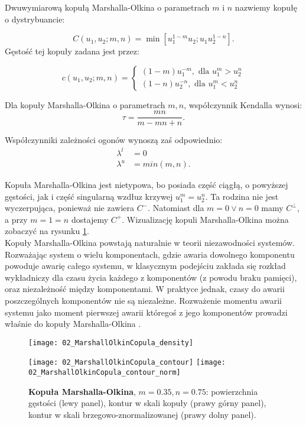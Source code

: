 \begin{df}
	Dwuwymiarową kopułą Marshalla-Olkina o parametrach $m$ i $n$ nazwiemy kopułę o dystrybuancie:
	
	$$ C(u_1, u_2; m,n) = \min[u_1^{1-m}u_2; u_1u_2^{1-n}].$$
	Gęstość tej kopuły zadana jest przez:
	
	$$
	c(u_1, u_2;m,n)=
	\begin{cases}
		(1-m)u_1^{-m},\text{ dla }u_1^m>u_2^n\\
		(1-n)u_2^{-n},\text{ dla }u_1^m<u_2^n
	\end{cases}
	$$	
\end{df}
\begin{prop}
	Dla kopuły Marshalla-Olkina o parametrach $m,n$, współczynnik Kendalla wynosi:
	$$ \tau = \frac{mn}{m-mn+n}.$$
	
	Współczynniki zależności ogonów wynoszą zaś odpowiednio:
	\begin{equation}
		\begin{split}
			\lambda^{l}&=0\\
			\lambda^{u}&=min(m,n).
		\end{split}
	\end{equation}
\end{prop}
Kopuła Marshalla-Olkina jest nietypowa, bo posiada część ciągłą, o powyższej gęstości, jak i część singularną wzdłuz krzywej $u_1^m=u_2^n$. Ta rodzina nie jest wyczerpująca, ponieważ nie zawiera $C^{-}$. Natomiast dla $m=0 \vee n=0$ mamy $C^{\perp}$, a przy $m=1=n$ dostajemy $C^{+}$. Wizualizację kopuli Marshalla-Olkina można zobaczyć na rysunku \ref{fig:marshall_olkin_copula_density}.\\
Kopuły Marshalla-Olkina powstają naturalnie w teorii niezawodności systemów. Rozważając system o wielu komponentach, gdzie awaria dowolnego komponentu powoduje awarię całego systemu, w klasycznym podejściu zakłada się rozkład wykładniczy dla czasu życia każdego z komponentów (z powodu braku pamięci), oraz niezależność między komponentami. W praktyce jednak, czasy do awarii poszczególnych komponentów nie są niezależne. Rozważenie momentu awarii systemu jako moment pierwszej awarii któregoś z jego komponentów prowadzi właśnie do kopuły Marshalla-Olkina \cite{Matus2019}.\\

\begin{figure}[h]
	\centering
	\begin{minipage}{0.5\linewidth}
		\texttt{[image: 02\_MarshallOlkinCopula\_density]}
	\end{minipage}
	\begin{minipage}{0.45\linewidth}
		\texttt{[image: 02\_MarshallOlkinCopula\_contour]}
		\texttt{[image: 02\_MarshallOlkinCopula\_contour\_norm]}
	\end{minipage}
	\caption{\textbf{Kopuła Marshalla-Olkina}, $m=0.35,n=0.75$: powierzchnia gęstości (lewy panel), kontur w skali kopuły (prawy górny panel), kontur w skali brzegowo-znormalizowanej (prawy dolny panel). \label{fig:marshall_olkin_copula_density}}
\end{figure}



